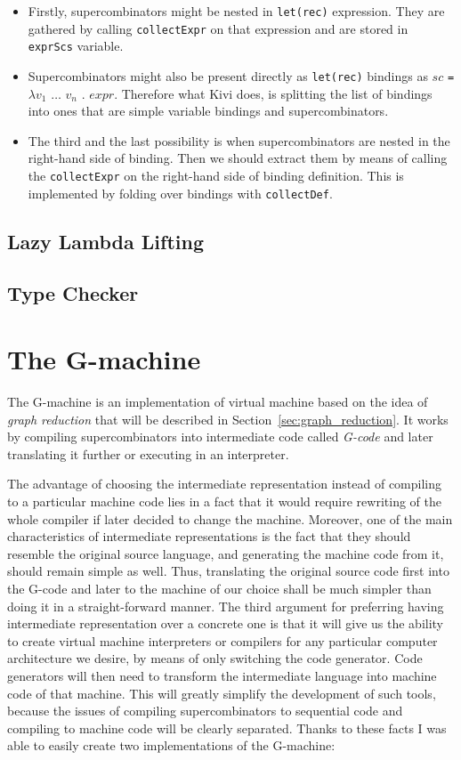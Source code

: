 \documentclass[12pt,a4paper]{report}
\begin{document}
\begin{itemize}
  \item Firstly, supercombinators might be nested in \texttt{let(rec)}
    expression. They are gathered by calling \texttt{collectExpr} on that
    expression and are stored in \texttt{exprScs} variable.
  \item Supercombinators might also be present directly as \texttt{let(rec)}
    bindings as $sc$ \texttt{=} $\lambda v_1$ $\ldots$ $v_n$ . $expr$.
    Therefore what Kivi does, is splitting the list of bindings into ones that
    are simple variable bindings and supercombinators.
  \item The third and the last possibility is when supercombinators are nested
    in the right-hand side of binding. Then we should extract them by means of
    calling the \texttt{collectExpr} on the right-hand side of binding
    definition. This is implemented by folding over bindings with
    \texttt{collectDef}.
\end{itemize}



\section{Lazy Lambda Lifting}
\section{Type Checker}


\chapter{The G-machine}
The G-machine is an implementation of virtual machine based on the idea of
\textit{graph reduction} that will be described in
Section~\ref{sec:graph_reduction}. It works by compiling supercombinators into
intermediate code called \textit{G-code} and later translating it further or
executing in an interpreter.

The advantage of choosing the intermediate representation instead of compiling
to a particular machine code lies in a fact that it would require rewriting of
the whole compiler if later decided to change the machine. Moreover, one of the
main characteristics of intermediate representations is the fact that they
should resemble the original source language, and generating the machine code
from it, should remain simple as well. Thus, translating the original source
code first into the G-code and later to the machine of our choice shall be much
simpler than doing it in a straight-forward manner. The third argument for
preferring having intermediate representation over a concrete one is that it
will give us the ability to create virtual machine interpreters or compilers
for any particular computer architecture we desire, by means of only switching
the code generator. Code generators will then need to transform the
intermediate language into machine code of that machine. This will greatly
simplify the development of such tools, because the issues of compiling
supercombinators to sequential code and compiling to machine code will be
clearly separated.  Thanks to these facts I was able to easily create two
implementations of the G-machine:
\end{document}
